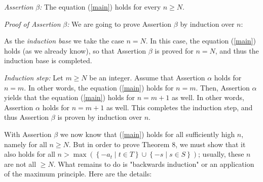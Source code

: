\documentclass[12pt,final,notitlepage,onecolumn]{article}%
\begin{document}
\textit{Assertion }$\beta$\textit{:} The equation (\ref{main}) holds for every
$n\geq N$.

\textit{Proof of Assertion }$\beta$\textit{:} We are going to prove Assertion
$\beta$ by induction over $n$:

As the \textit{induction base} we take the case $n=N$. In this case, the
equation (\ref{main}) holds (as we already know), so that Assertion $\beta$ is
proved for $n=N$, and thus the induction base is completed.

\textit{Induction step:} Let $m\geq N$ be an integer. Assume that Assertion
$\alpha$ holds for $n=m$. In other words, the equation (\ref{main}) holds for
$n=m$. Then, Assertion $\alpha$ yields that the equation (\ref{main}) holds
for $n=m+1$ as well. In other words, Assertion $\alpha$ holds for $n=m+1$ as
well. This completes the induction step, and thus Assertion $\beta$ is proven
by induction over $n$.

With Assertion $\beta$ we now know that (\ref{main}) holds for all
sufficiently high $n$, namely for all $n\geq N$. But in order to prove Theorem
8, we must show that it also holds for all $n>\max\left(  \left\{  -a_{t}\mid
t\in T\right\}  \cup\left\{  -s\mid s\in S\right\}  \right)  $; usually, these
$n$ are not all $\geq N$. What remains to do is "backwards induction" or an
application of the maximum principle. Here are the details:
\end{document}

